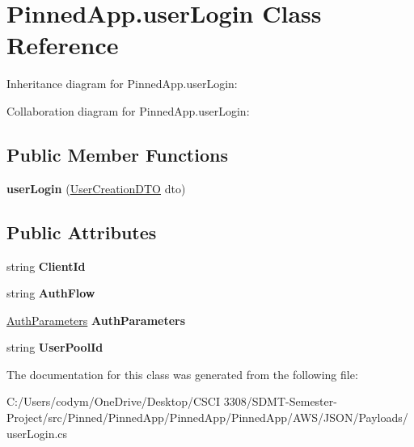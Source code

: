 \hypertarget{class_pinned_app_1_1user_login}{}\section{Pinned\+App.\+user\+Login Class Reference}
\label{class_pinned_app_1_1user_login}


Inheritance diagram for Pinned\+App.\+user\+Login\+:


Collaboration diagram for Pinned\+App.\+user\+Login\+:
\subsection*{Public Member Functions}
\begin{DoxyCompactItemize}
\item 
\mbox{\label{class_pinned_app_1_1user_login_a554fca64e6271839629b9832199f7e85}} 
{\bfseries user\+Login} (\hyperlink{class_pinned_app_1_1_user_creation_d_t_o}{User\+Creation\+D\+TO} dto)
\end{DoxyCompactItemize}
\subsection*{Public Attributes}
\begin{DoxyCompactItemize}
\item 
\mbox{\label{class_pinned_app_1_1user_login_af6a455f942290e1225922a8c21773381}} 
string {\bfseries Client\+Id}
\item 
\mbox{\label{class_pinned_app_1_1user_login_a184cf4352cf7d5c5d3f1b094f50f9c46}} 
string {\bfseries Auth\+Flow}
\item 
\mbox{\label{class_pinned_app_1_1user_login_a71c6049f6534da216094c065c7bf3c4a}} 
\hyperlink{class_pinned_app_1_1_auth_parameters}{Auth\+Parameters} {\bfseries Auth\+Parameters}
\item 
\mbox{\label{class_pinned_app_1_1user_login_a4c2430db55066e3f6a95a2d16463d4b6}} 
string {\bfseries User\+Pool\+Id}
\end{DoxyCompactItemize}


The documentation for this class was generated from the following file\+:\begin{DoxyCompactItemize}
\item 
C\+:/\+Users/codym/\+One\+Drive/\+Desktop/\+C\+S\+C\+I 3308/\+S\+D\+M\+T-\/\+Semester-\/\+Project/src/\+Pinned/\+Pinned\+App/\+Pinned\+App/\+Pinned\+App/\+A\+W\+S/\+J\+S\+O\+N/\+Payloads/user\+Login.\+cs\end{DoxyCompactItemize}
